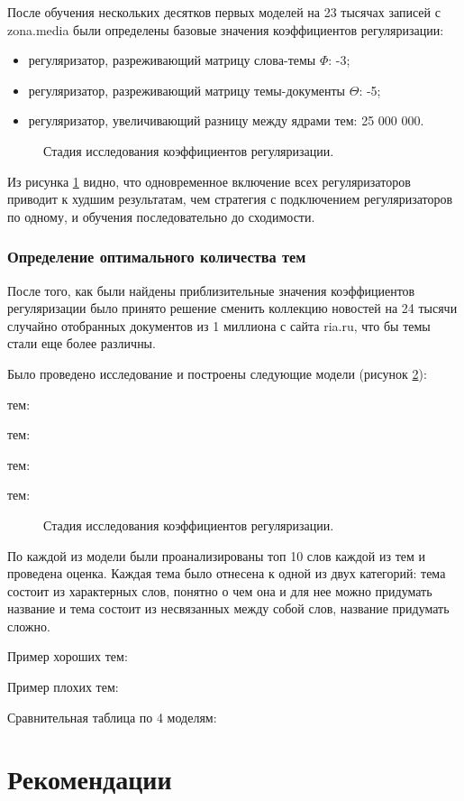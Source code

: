 После обучения нескольких десятков первых моделей на 23 тысячах записей с zona.media были определены базовые значения коэффициентов регуляризации:

\begin{itemize}
    \item регуляризатор, разреживающий матрицу слова-темы $\Phi$: -3;
    \item регуляризатор, разреживающий матрицу темы-документы $\Theta$: -5;
    \item регуляризатор, увеличивающий разницу между ядрами тем: 25 000 000.
\end{itemize}

\begin{figure}[h]
    \caption{Стадия исследования коэффициентов регуляризации.}
    \label{fig:res_table_1}
\end{figure}

Из \todo{}рисунка \ref{fig:res_table_1} видно, что одновременное включение всех регуляризаторов приводит к худшим результатам, чем стратегия с подключением регуляризаторов по одному, и обучения последовательно до сходимости.
\subsubsection{Определение оптимального количества тем}

После того, как были найдены приблизительные значения коэффициентов регуляризации было принято решение сменить коллекцию новостей на 24 тысячи случайно отобранных документов из 1 миллиона с сайта ria.ru, что бы темы стали еще более различны.

Было проведено исследование и построены следующие модели (рисунок \ref{fig:res_table_2}):

 тем:

 тем:

 тем:

 тем:

\begin{figure}[h]
    \caption{Стадия исследования коэффициентов регуляризации.}
    \label{fig:res_table_2}
\end{figure}

По каждой из модели были проанализированы топ 10 слов каждой из тем и проведена оценка. Каждая тема было отнесена к одной из двух категорий: тема состоит из характерных слов, понятно о чем она и для нее можно придумать название и тема состоит из несвязанных между собой слов, название придумать сложно.

Пример хороших тем:

Пример плохих тем:

Сравнительная таблица по 4 моделям:

%
\section{Рекомендации}

